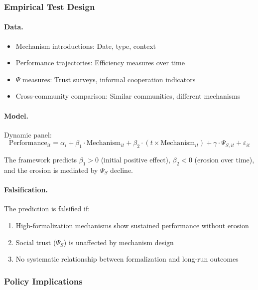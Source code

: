 \subsubsection{Empirical Test Design}

\paragraph{Data.}
\begin{itemize}
  \item Mechanism introductions: Date, type, context
  \item Performance trajectories: Efficiency measures over time
  \item $\Psi$ measures: Trust surveys, informal cooperation indicators
  \item Cross-community comparison: Similar communities, different mechanisms
\end{itemize}

\paragraph{Model.}
Dynamic panel:
\begin{equation}
\text{Performance}_{it} = \alpha_i + \beta_1 \cdot \text{Mechanism}_{it} + \beta_2 \cdot (t \times \text{Mechanism}_{it}) + \gamma \cdot \Psi_{S,it} + \varepsilon_{it}
\end{equation}

The framework predicts $\beta_1 > 0$ (initial positive effect), $\beta_2 < 0$ (erosion over time), 
and the erosion is mediated by $\Psi_S$ decline.

\paragraph{Falsification.}
The prediction is falsified if:
\begin{enumerate}
  \item High-formalization mechanisms show sustained performance without erosion
  \item Social trust ($\Psi_S$) is unaffected by mechanism design
  \item No systematic relationship between formalization and long-run outcomes
\end{enumerate}

\subsubsection{Policy Implications}

